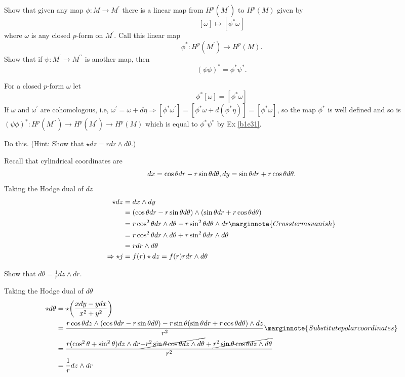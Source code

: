 \documentclass[10pt]{article}
\begin{document}
\begin{example}\label{b1e99}
	Show that given any map $\phi:M\to M^\prime$ there is a linear map from $H^p(M^\prime)$ to $H^p(M)$ given by
	$$
		[\omega] \mapsto [\phi^*\omega]
	$$
	where $\omega$ is any closed $p$-form on $M^\prime$. Call this linear map
	$$
	\phi^*:H^p(M^\prime) \to H^p(M).
	$$
	Show that if $\psi: M^\prime \to M^{\prime\prime}$ is another map, then
	$$
	(\psi\phi)^* = \phi^*\psi^*.
	$$
\end{example}
\sol For a closed $p$-form $\omega$ let
$$
	\phi^*[\omega] = [\phi^*\omega]
$$
If $\omega$ and $\omega^\prime$ are cohomologous, i.e, $\omega^\prime = \omega + d\eta \Rightarrow [\phi^*\omega^\prime] = [\phi^*\omega + d(\phi^*\eta)] = [\phi^*\omega]$, so the map $\phi^*$ is well defined and so is $(\psi\phi)^*:H^p(M^{\prime\prime}) \to H^p(M^\prime) \to H^p(M)$ which is equal to $\phi^*\psi^*$ by Ex \ref{b1e31}.


\begin{example}\label{b1e100}
	Do this. (Hint: Show that $\star dz = rdr \wedge d\theta$.)
\end{example}
\sol Recall that cylindrical coordinates are
$$
dx = \cos\theta dr - r\sin\theta d\theta,\\
dy = \sin\theta dr + r\cos\theta d\theta.
$$
Taking the Hodge dual of $dz$
$$
\begin{aligned}
	\star dz &= dx \wedge dy\\
	&= (\cos\theta dr - r\sin\theta d\theta) \wedge (\sin\theta dr + r\cos\theta d\theta)\\
	&= r\cos^2\theta dr \wedge d\theta - r\sin^2\theta d\theta \wedge dr\marginnote{Cross terms vanish}\\
	&= r\cos^2\theta dr \wedge d\theta + r\sin^2\theta dr \wedge d\theta\\
	&= rdr \wedge d\theta\\
	\Rightarrow \star j &= f(r)\star dz = f(r)r dr \wedge d\theta
\end{aligned}
$$


\begin{example}
	Show that $d\theta = \frac1r dz \wedge dr$.
\end{example}
\sol Taking the Hodge dual of $d\theta$
$$
\begin{aligned}
	\star d\theta &= \star\p*{\frac{xdy-ydx}{x^2+y^2}}\\
	&= \frac{r\cos\theta dz\wedge (\cos\theta dr - r\sin\theta d\theta)- r\sin\theta (\sin\theta dr + r\cos\theta d\theta)\wedge dz}{r^2}\marginnote{Substitute polar coordinates}\\
	&= \frac{r(\cos^2\theta +\sin^2\theta) dz \wedge dr \cancel{- r^2\sin\theta\cos\theta dz\wedge d\theta} + \cancel{r^2\sin\theta\cos\theta dz\wedge d\theta}}{r^2}\\
	&= \frac1r dz \wedge dr
\end{aligned}
$$
\end{document}

